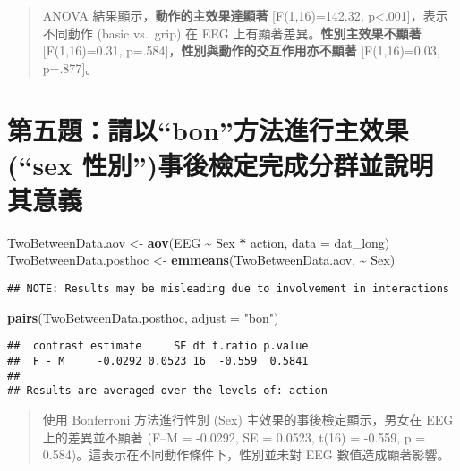 \documentclass[
  12pt,
]{article}
\newenvironment{Shaded}{\begin{snugshade}}{\end{snugshade}}
\newcommand{\AttributeTok}[1]{\textcolor[rgb]{0.13,0.29,0.53}{#1}}
\newcommand{\FunctionTok}[1]{\textcolor[rgb]{0.13,0.29,0.53}{\textbf{#1}}}
\newcommand{\NormalTok}[1]{#1}
\newcommand{\OtherTok}[1]{\textcolor[rgb]{0.56,0.35,0.01}{#1}}
\newcommand{\SpecialCharTok}[1]{\textcolor[rgb]{0.81,0.36,0.00}{\textbf{#1}}}
\newcommand{\StringTok}[1]{\textcolor[rgb]{0.31,0.60,0.02}{#1}}
\begin{document}
\begin{quote}
ANOVA 結果顯示，\textbf{動作的主效果達顯著} {[}F(1,16)=142.32,
p\textless.001{]}，表示不同動作 (basic vs.~grip) 在 EEG
上有顯著差異。\textbf{性別主效果不顯著} {[}F(1,16)=0.31,
p=.584{]}，\textbf{性別與動作的交互作用亦不顯著} {[}F(1,16)=0.03,
p=.877{]}。
\end{quote}

\section{第五題：請以``bon''方法進行主效果(``sex
性別'')事後檢定完成分群並說明其意義}\label{ux7b2cux4e94ux984cux8acbux4ee5bonux65b9ux6cd5ux9032ux884cux4e3bux6548ux679csex-ux6027ux5225ux4e8bux5f8cux6aa2ux5b9aux5b8cux6210ux5206ux7fa4ux4e26ux8aaaux660eux5176ux610fux7fa9}

\begin{Shaded}
\begin{Highlighting}[]
\NormalTok{TwoBetweenData.aov }\OtherTok{\textless{}{-}} \FunctionTok{aov}\NormalTok{(EEG }\SpecialCharTok{\textasciitilde{}}\NormalTok{ Sex }\SpecialCharTok{*}\NormalTok{ action, }\AttributeTok{data =}\NormalTok{ dat\_long)}
\NormalTok{TwoBetweenData.posthoc }\OtherTok{\textless{}{-}} \FunctionTok{emmeans}\NormalTok{(TwoBetweenData.aov, }\SpecialCharTok{\textasciitilde{}}\NormalTok{ Sex)}
\end{Highlighting}
\end{Shaded}

\begin{verbatim}
## NOTE: Results may be misleading due to involvement in interactions
\end{verbatim}

\begin{Shaded}
\begin{Highlighting}[]
\FunctionTok{pairs}\NormalTok{(TwoBetweenData.posthoc, }\AttributeTok{adjust =} \StringTok{"bon"}\NormalTok{)}
\end{Highlighting}
\end{Shaded}

\begin{verbatim}
##  contrast estimate     SE df t.ratio p.value
##  F - M     -0.0292 0.0523 16  -0.559  0.5841
## 
## Results are averaged over the levels of: action
\end{verbatim}

\begin{quote}
使用 Bonferroni 方法進行性別 (Sex) 主效果的事後檢定顯示，男女在 EEG
上的差異並不顯著 (F--M = -0.0292, SE = 0.0523, t(16) = -0.559, p =
0.584)。這表示在不同動作條件下，性別並未對 EEG 數值造成顯著影響。
\end{quote}
\end{document}
